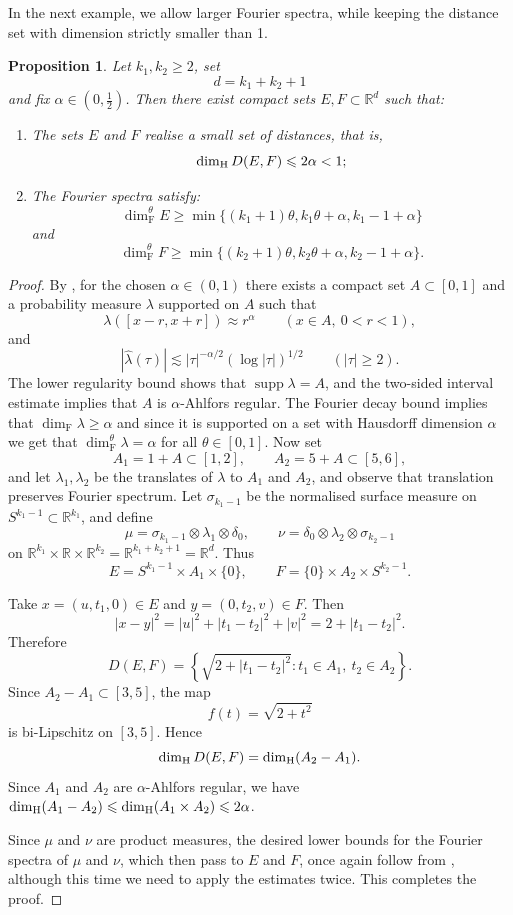 \documentclass[11pt]{amsart}
\newcommand{\what}{\widehat}
\numberwithin{equation}{section}
\renewcommand{\ge}{\geqslant}
\renewcommand{\le}{\leqslant}
\renewcommand{\geq}{\geqslant}
\renewcommand{\leq}{\leqslant}
\newcommand{\hd}{\dim_{\textup{H}}}
\newcommand{\fs}{\dim^\theta_{\mathrm{F}}}
\newcommand{\fd}{\dim_{\mathrm{F}}}
\newtheorem{proposition}[theorem]{Proposition}
\theoremstyle{plain}
\theoremstyle{remark}
\newcommand{\R}{\mathbb{R}}
\newcommand{\supp}{\operatorname{supp}}
\begin{document}
In the next example, we  allow larger Fourier spectra, while keeping the distance set with dimension strictly smaller than 1. 

\begin{proposition}\label{ex2}
    Let $k_1,k_2\ge 2$,  set
\[
d=k_1+k_2+1
\]
and fix $\alpha \in (0,\frac12)$. Then there exist compact sets $E,F\subset \R^d$  such that:
\begin{enumerate}[label=\textup{(\roman*)},itemsep=2pt]
\item The sets $E$ and $F$ realise a small set of distances, that is, 
\[
\hd D(E,F)\le 2\alpha<1;
\]
\item The Fourier spectra satisfy: 
\[
\fs E \geq \min\{(k_1+1)\theta, k_1 \theta+\alpha, k_1-1+\alpha\}
\]
and
\[
\fs F \geq \min\{(k_2+1)\theta, k_2 \theta+\alpha, k_2-1+\alpha\}.
\]
\end{enumerate}
\end{proposition}
\begin{proof}
    By \cite[Theorem~2]{Chen}, for the chosen $\alpha\in(0,1)$ there exists a compact set $A\subset[0,1]$ and a probability measure $\lambda$ supported on $A$ such that
\[
\lambda([x-r,x+r])\approx r^\alpha
\qquad (x\in A,\ 0<r<1),
\]
and
\[
|\what\lambda(\tau)|\lesssim |\tau|^{-\alpha/2}(\log |\tau|)^{1/2}
\qquad (|\tau|\ge 2).
\]
The lower regularity bound shows that $\supp\lambda=A$, and the two-sided interval estimate implies that $A$ is $\alpha$-Ahlfors regular. The Fourier decay bound implies that $\fd \lambda \geq \alpha$ and since it is supported on a set with Hausdorff dimension $\alpha$ we get that $\fs \lambda = \alpha$ for all $\theta \in [0,1]$. Now set
\[
A_1=1+A\subset[1,2],
\qquad
A_2=5+A\subset[5,6],
\]
and let $\lambda_1,\lambda_2$ be the translates of $\lambda$ to $A_1$ and $A_2$, and observe that translation preserves Fourier spectrum. Let $\sigma_{k_1-1}$ be the normalised surface measure on $S^{k_1-1}\subset\R^{k_1}$, and define
\[
\mu=\sigma_{k_1-1}\otimes\lambda_1\otimes\delta_0,
\qquad
\nu=\delta_0\otimes\lambda_2\otimes\sigma_{k_2-1}
\]
on $\R^{k_1}\times\R\times\R^{k_2} = \R^{k_1+k_2+1}=\R^d$. Thus
\[
E=S^{k_1-1}\times A_1\times\{0\},
\qquad
F=\{0\}\times A_2\times S^{k_2-1}.
\]

Take $x=(u,t_1,0)\in E$ and $y=(0,t_2,v)\in F$. Then
\[
|x-y|^2=|u|^2+|t_1-t_2|^2+|v|^2 = 2+|t_1-t_2|^2.
\]
Therefore
\[
D(E,F)=\left\{ \sqrt{2+|t_1-t_2|^2} : t_1\in A_1,\ t_2\in A_2\right\}.
\]
Since $A_2-A_1\subset[3,5]$, the map
\[
f(t)=\sqrt{2+t^2}
\]
is bi-Lipschitz on $[3,5]$. Hence
\[
\hd D(E,F)=\hd(A_2-A_1).
\]
Since $A_1$ and $A_2$ are $\alpha$-Ahlfors regular, we have $\hd(A_1-A_2)\le \hd (A_1 \times A_2) \leq 2\alpha$.

Since $\mu$ and $\nu$ are product measures, the desired lower bounds for the Fourier spectra of $\mu$ and $\nu$, which then pass to $E$ and $F$, once again follow from \cite[Theorem 2.1]{JMF2}, although this time we need to apply the estimates twice. This completes the proof.
\end{proof}
 
\end{document}
